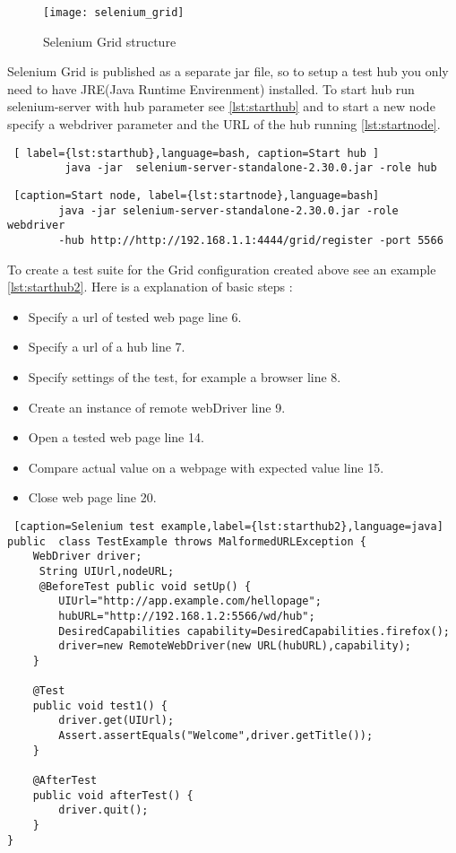 		\begin{figure}
		\label{fig:selnium_grid}
		\texttt{[image: selenium\_grid]}
		\caption{Selenium Grid structure}
		\end{figure}
		
		Selenium Grid is published as a separate jar file, so to setup a test hub you
		only need to have JRE(Java Runtime Envirenment) installed. To start hub run
		selenium-server with hub parameter see \ref{lst:starthub} and to start a new
		node specify a webdriver parameter and the URL of the hub running \ref{lst:startnode}.
		
		\begin{lstlisting} [ label={lst:starthub},language=bash, caption=Start hub ]
		 java -jar	selenium-server-standalone-2.30.0.jar -role hub
		\end{lstlisting}

		\begin{lstlisting} [caption=Start node, label={lst:startnode},language=bash]
		java -jar selenium-server-standalone-2.30.0.jar -role webdriver
		-hub http://http://192.168.1.1:4444/grid/register -port 5566
		\end{lstlisting}
		

	To create a test suite for the Grid configuration created above see an
	example \ref{lst:starthub2}. Here is a explanation of basic steps :
	\begin{itemize}
	  \item Specify a url of tested web page line 6.
	  \item Specify a url of a hub line 7.
	  \item Specify settings of the test, for example a browser line 8.
	  \item Create an instance of remote webDriver line 9.
	  \item Open a tested web page line 14.
	  \item Compare actual value on a webpage with expected value line 15.
	  \item Close web page line 20.
	\end{itemize}
	
	\lstset{style=a1listing}
	\begin{lstlisting} [caption=Selenium test example,label={lst:starthub2},language=java]
public 	class TestExample throws MalformedURLException {
 	WebDriver driver;
 	 String UIUrl,nodeURL;
 	 @BeforeTest public void setUp() {
 	 	UIUrl="http://app.example.com/hellopage"; 
		hubURL="http://192.168.1.2:5566/wd/hub";
		DesiredCapabilities capability=DesiredCapabilities.firefox();
		driver=new RemoteWebDriver(new URL(hubURL),capability);
	}
		
	@Test
	public void test1() {
		driver.get(UIUrl);
		Assert.assertEquals("Welcome",driver.getTitle());
	}
	
	@AfterTest
	public void afterTest() {
		driver.quit();
	}
}
	\end{lstlisting}

